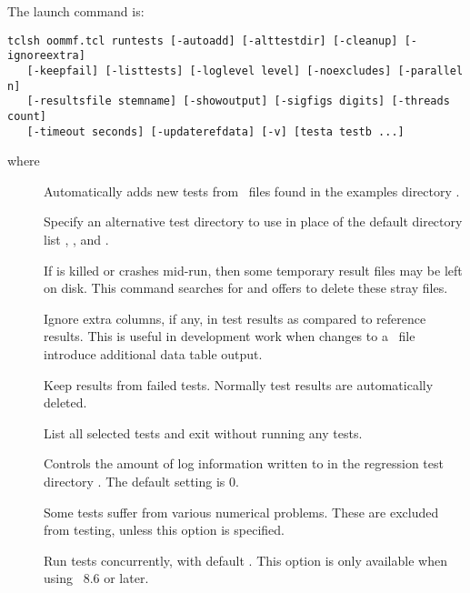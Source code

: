 The  launch command is:
\begin{verbatim}
tclsh oommf.tcl runtests [-autoadd] [-alttestdir] [-cleanup] [-ignoreextra]
   [-keepfail] [-listtests] [-loglevel level] [-noexcludes] [-parallel n]
   [-resultsfile stemname] [-showoutput] [-sigfigs digits] [-threads count]
   [-timeout seconds] [-updaterefdata] [-v] [testa testb ...]
\end{verbatim}
where
\begin{description}
\item[]
 Automatically adds new tests from \MIF\ files found in the examples
 directory .
\item[]
\begin{flushleft}
Specify an alternative test directory to use in place of the default
directory list ,
, and
.
\end{flushleft}
\item[]
If  is killed or crashes mid-run, then some temporary
result files may be left on disk. This command searches for and offers to
delete these stray files.
\item[]
 Ignore extra columns, if any, in test results as compared to
 reference results.  This is useful in development work when
 changes to a \MIF\ file introduce additional data table output.
\item[]
  Keep results from failed tests.  Normally test results are
  automatically deleted.
\item[]
  List all selected tests and exit without running any tests.
\item[]
  Controls the amount of log information written to
   in the regression test directory
  .  The default setting is 0.
\item[]
  Some tests suffer from various numerical problems.  These are
  excluded from testing, unless this option is specified.
\item[]
  Run  tests concurrently, with default . This option is
  only available when using \Tcl\ 8.6 or later.

\end{description}
